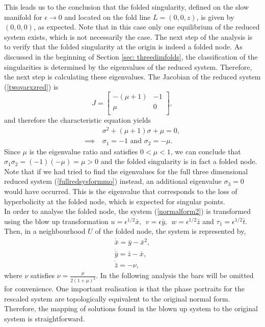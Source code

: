 This leads us to the conclusion that the folded singularity, defined on the slow manifold for $\epsilon \to 0$ and located on the fold line $L=(0,0,z)$, is given by $(0,0,0)$, as expected. Note that in this case only one equilibrium of the reduced system exists, which is not necessarily the case.
The next step of the analysis is to verify that the folded singularity at the origin is indeed a folded node.
As discussed in the beginning of Section \ref{sec: threedimfolds}, the classification of the singularities is determined by the eigenvalues of the reduced system. Therefore, the next step is calculating these eigenvalues.
The Jacobian of the reduced system (\ref{twovarxzred}) is
\begin{equation}
J=\begin{bmatrix}
-(\mu +1) & -1 \\
\mu & 0 \\
\end{bmatrix},
\end{equation}
and therefore the characteristic equation yields
\begin{align*}
&\sigma^2 +(\mu +1)\sigma + \mu = 0, \\
\implies \ &\sigma_1= -1 \textrm{\ \ \ and \ \ \ } \sigma_2 = -\mu.
\end{align*}
Since $\mu$ is the eigenvalue ratio and satisfies $0< \mu < 1$, we can conclude that $ \sigma_1\sigma_2 = (-1)(-\mu)=\mu >0 $
and the folded singularity is in fact a folded node. Note that if we had tried to find the eigenvalues for the full three dimensional reduced system (\ref{fullredsysformmo}) instead, an additional eigenvalue $\sigma_3=0$ would have occurred. This is the eigenvalue that corresponds to the loss of hyperbolicity at the folded node, which is expected for singular points.\\

In order to analyse the folded node, the system (\ref{normalform2}) is transformed using the blow up transformation $u= \epsilon^{1/2}\bar{x},\ \  v=\epsilon \bar{y}, \ \ w= \epsilon^{1/2} \bar{z}$ and $ \tau_1 = \epsilon^{1/2} \bar{t}$.
Then, in a neighbourhood $U$ of the folded node, the system is represented by,
\begin{align*}
\dot{\bar{x}}= \bar{y} - \bar{x}^2,\\
\dot{\bar{y}}=\bar{z} - \bar{x}, \\
\dot{\bar{z}}= - \nu,
\end{align*}
where $\nu$ satisfies $\nu = \frac{\mu}{2(1+\mu)^2}$.
In the following analysis the bars will be omitted for convenience.
One important realisation is that the phase portraits for the rescaled system are topologically equivalent to the original normal form. Therefore, the mapping of solutions  found in the blown up system to the original system is straightforward.\\

